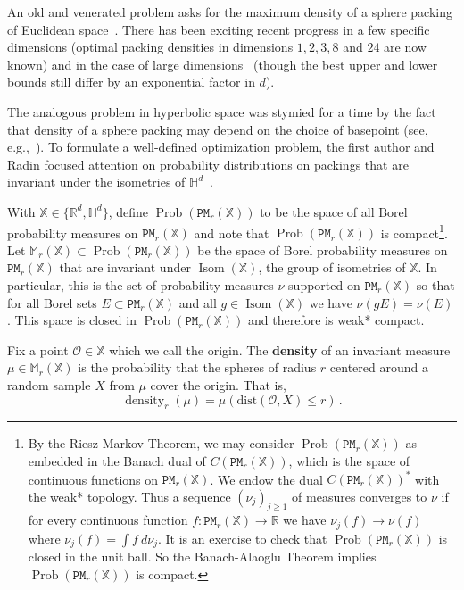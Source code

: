 \documentclass[11pt]{amsart}
\theoremstyle{definition}
\theoremstyle{remark}
\renewcommand{\H}{\mathbb{H}}
\newcommand{\R}{\mathbb{R}}
\newcommand{\M}{\mathbb{M}}
\newcommand{\bX}{\mathbb{X}}
\newcommand{\cO}{\mathcal{O}}
\newcommand{\cP}{\mathtt{PM}}
\newcommand{\Isom}{\operatorname{Isom}}
\newcommand{\density}{\operatorname{density}}
\newcommand{\Prob}{\operatorname{Prob}}
\newcommand{\dist}{\mathrm{dist}}
\begin{document}
An old and venerated problem asks for the maximum density of a  sphere packing of Euclidean space~\cite{conway2013sphere,cohn2017conceptual}. There has been exciting recent progress in a few specific dimensions \cite{viazovska2017sphere,cohn2016sphere} (optimal packing densities in dimensions $1,2,3,8$ and $24$ are now known)  and in the case of large dimensions~\cite{campos2023new,klartag2026lattice} (though the best upper and lower bounds still differ by an exponential factor in $d$). 

The analogous problem in hyperbolic space was stymied for a  time by the fact that density of a sphere packing may depend on the choice of basepoint (see, e.g.,~\cite{boroczky1978packing,toth1993packing,MR1604938}). To formulate a well-defined optimization problem, the first author and Radin focused attention on probability distributions on packings that are invariant under the isometries of $\H^d$~\cite{bowen2002densest}. 



With $\bX \in \{ \R^d, \H^d\}$, define $\Prob(\cP_r(\bX))$ to be the space of all Borel probability measures on $\cP_r(\bX)$ and note that $\Prob(\cP_r(\bX))$ is compact\footnote{By the Riesz-Markov Theorem, we may consider $\Prob(\cP_r(\bX))$ as embedded in the Banach dual of $C(\cP_r(\bX))$, which is the space of continuous functions on $\cP_r(\bX)$. We endow the dual  $C(\cP_r(\bX))^*$ with the weak* topology. Thus a sequence $(\nu_j)_{j \geq 1}$ of measures converges to $\nu$ if for every continuous function $f:\cP_r(\bX) \to \R$ we have $\nu_j(f) \to \nu(f)$ where $\nu_j(f)=\int f~d\nu_j$.  It is an exercise to check that $\Prob(\cP_r(\bX))$ is closed in the unit ball.  So the Banach-Alaoglu Theorem implies $\Prob(\cP_r(\bX))$ is compact.}. 
Let $\M_r(\bX)\subset \Prob(\cP_r(\bX))$ be the space of Borel probability measures on $\cP_r(\bX)$ that are invariant under $\Isom(\bX)$, the group of isometries of $\bX$.  In particular, this is the set of probability measures $\nu$ supported on $\cP_r(\bX)$ so that for all Borel sets $E \subset \cP_r(\bX)$ and all $g \in \Isom(\bX)$ we have $\nu(gE) =\nu(E)$. This space is closed in $\Prob(\cP_r(\bX))$ and therefore is weak* compact. 




Fix a point $\cO \in \bX$ which we call the origin.  The {\bf density} of an invariant measure $\mu \in \M_r(\bX)$ is the probability that the spheres of radius $r$ centered around  a random sample $X$ from $\mu$ cover the origin. That is,
$$\density_r(\mu) = \mu( \dist (\cO, X) \le r) \, .$$
\end{document}
